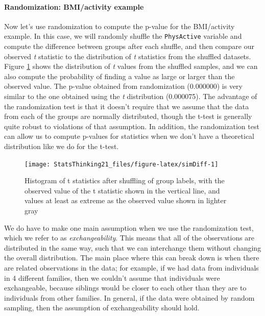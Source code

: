\documentclass[12pt,]{book}
\let\oldparagraph\paragraph
\renewcommand{\paragraph}[1]{\oldparagraph{#1}\mbox{}}
\theoremstyle{definition}
\theoremstyle{definition}
\theoremstyle{definition}
\theoremstyle{remark}
\begin{document}
\hypertarget{randomization-bmiactivity-example}{%
\paragraph{Randomization: BMI/activity example}\label{randomization-bmiactivity-example}}

Now let's use randomization to compute the p-value for the BMI/activity example. In this case, we will randomly shuffle the \texttt{PhysActive} variable and compute the difference between groups after each shuffle, and then compare our observed \emph{t} statistic to the distribution of \emph{t} statistics from the shuffled datasets. Figure \ref{fig:simDiff} shows the distribution of \emph{t} values from the shuffled samples, and we can also compute the probability of finding a value as large or larger than the observed value. The p-value obtained from randomization (0.000000) is very similar to the one obtained using the \emph{t} distribution (0.000075). The advantage of the randomization test is that it doesn't require that we assume that the data from each of the groups are normally distributed, though the t-test is generally quite robust to violations of that assumption. In addition, the randomization test can allow us to compute p-values for statistics when we don't have a theoretical distribution like we do for the t-test.

\begin{figure}
\texttt{[image: StatsThinking21\_files/figure-latex/simDiff-1]} \caption{Histogram of t statistics after shuffling of group labels, with the observed value of the t statistic shown in the vertical line, and values at least as extreme as the observed value shown in lighter gray}\label{fig:simDiff}
\end{figure}

We do have to make one main assumption when we use the randomization test, which we refer to as \emph{exchangeability}. This means that all of the observations are distributed in the same way, such that we can interchange them without changing the overall distribution. The main place where this can break down is when there are related observations in the data; for example, if we had data from individuals in 4 different families, then we couldn't assume that individuals were exchangeable, because siblings would be closer to each other than they are to individuals from other families. In general, if the data were obtained by random sampling, then the assumption of exchangeability should hold.
\end{document}
